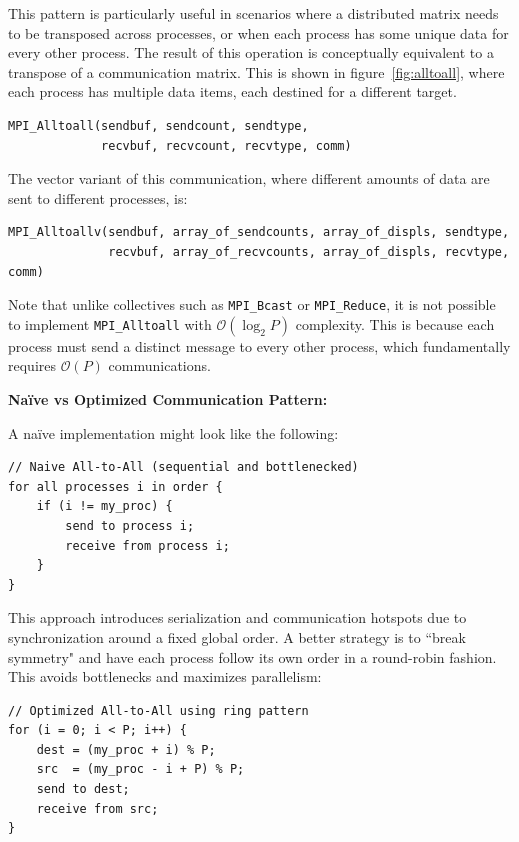 \documentclass[12pt]{book}
\begin{document}
This pattern is particularly useful in scenarios where a distributed matrix needs to be transposed across processes, or when each process has some unique data for every other process. The result of this operation is conceptually equivalent to a transpose of a communication matrix. This is shown in figure~\ref{fig:alltoall}, where each process has multiple data items, each destined for a different target.

\begin{lstlisting}[style=cppstyle]
MPI_Alltoall(sendbuf, sendcount, sendtype,
             recvbuf, recvcount, recvtype, comm)
\end{lstlisting}

The vector variant of this communication, where different amounts of data are sent to different processes, is:

\begin{lstlisting}[style=cppstyle]
MPI_Alltoallv(sendbuf, array_of_sendcounts, array_of_displs, sendtype,
              recvbuf, array_of_recvcounts, array_of_displs, recvtype, comm)
\end{lstlisting}

Note that unlike collectives such as \texttt{MPI\_Bcast} or \texttt{MPI\_Reduce}, it is not possible to implement \texttt{MPI\_Alltoall} with $\mathcal{O}(\log_2 P)$ complexity. This is because each process must send a distinct message to every other process, which fundamentally requires $\mathcal{O}(P)$ communications.

\vspace{1em}
\textbf{Naïve vs Optimized Communication Pattern:}

A naïve implementation might look like the following:

\begin{lstlisting}[style=cppstyle]
// Naive All-to-All (sequential and bottlenecked)
for all processes i in order {
    if (i != my_proc) {
        send to process i;
        receive from process i;
    }
}
\end{lstlisting}

This approach introduces serialization and communication hotspots due to synchronization around a fixed global order. A better strategy is to ``break symmetry" and have each process follow its own order in a round-robin fashion. This avoids bottlenecks and maximizes parallelism:

\begin{lstlisting}[style=cppstyle]
// Optimized All-to-All using ring pattern
for (i = 0; i < P; i++) {
    dest = (my_proc + i) % P;
    src  = (my_proc - i + P) % P;
    send to dest;
    receive from src;
}
\end{lstlisting}
\end{document}
